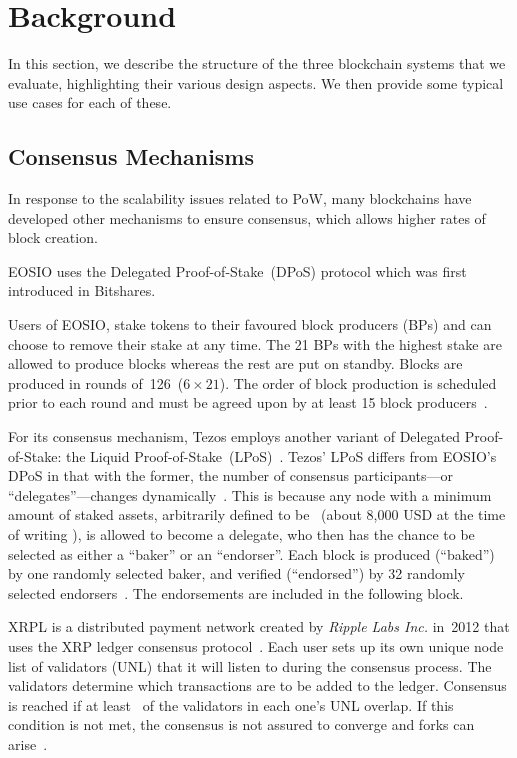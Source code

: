 \section{Background}
\label{sec:4:background}

In this section, we describe the structure of the three blockchain systems that we evaluate, highlighting their various design aspects. We then provide some typical use cases for each of these.

\subsection{Consensus Mechanisms}

In response to the scalability issues related to PoW, many blockchains have developed other mechanisms to ensure consensus, which allows higher rates of block creation.

\label{sec:DPoS}
EOSIO uses the Delegated Proof-of-Stake~(DPoS) protocol which was first introduced in Bitshares\cite{bitshares}.

Users of EOSIO, stake  tokens to their favoured block producers (BPs) and can choose to remove their stake at any time.
The 21 BPs with the highest stake are allowed to produce blocks whereas the rest are put on standby.
Blocks are produced in rounds of~126~($6 \times 21$).
The order of block production is scheduled prior to each round and must be agreed upon by at least 15 block producers~\cite{EOS}.


For its consensus mechanism, Tezos employs another variant of Delegated Proof-of-Stake: the Liquid Proof-of-Stake~(LPoS)~\cite{Tezos2018}.
Tezos' LPoS differs from EOSIO's DPoS in that with the former, the number of consensus participants---or ``delegates''---changes dynamically~\cite{Tezos2018, Goodman2014}.
This is because any node with a minimum amount of staked assets, arbitrarily defined to be~  (about 8,000 USD at the time of writing \cite{CoinMarketCap2020}), is allowed to become a delegate, who then has the chance to be selected as either a ``baker'' or an ``endorser''.
Each block is produced (``baked'') by one randomly selected baker, and verified (``endorsed'') by 32 randomly selected endorsers~\cite{Tezos2018}.
The endorsements are included in the following block.

XRPL is a distributed payment network created by \textit{Ripple Labs Inc.} in~2012 that uses the XRP ledger consensus protocol~\cite{Chase2018}.
Each user sets up its own unique node list of validators (UNL) that it will listen to during the consensus process.
The validators determine which transactions are to be added to the ledger.
Consensus is reached if at least~ of the validators in each one's UNL overlap. If this condition is not met, the consensus is not assured to converge and forks can arise~\cite{Chase2018}.

